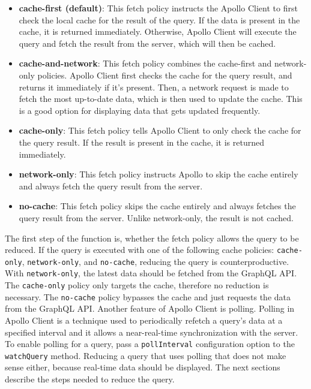 \begin{itemize}
  \item \textbf{cache-first (default)}: This fetch policy instructs the Apollo Client to first check the local cache for the result of the query. If the data is present in the cache, it is returned immediately. Otherwise, Apollo Client will execute the query and fetch the result from the server, which will then be cached.
  \item \textbf{cache-and-network}: This fetch policy combines the cache-first and network-only policies. Apollo Client first checks the cache for the query result, and returns it immediately if it's present. Then, a network request is made to fetch the most up-to-date data, which is then used to update the cache. This is a good option for displaying data that gets updated frequently.
  \item \textbf{cache-only}: This fetch policy tells Apollo Client to only check the cache for the query result. If the result is present in the cache, it is returned immediately.
  \item \textbf{network-only}: This fetch policy instructs Apollo to skip the cache entirely and always fetch the query result from the server.
  \item \textbf{no-cache}: This fetch policy skips the cache entirely and always fetches the query result from the server. Unlike network-only, the result is not cached.
\end{itemize}

\noindent The first step of the function is, whether the fetch policy allows the query to be reduced. If the query is executed with one of the following cache policies: \texttt{cache-only}, \texttt{network-only}, and \texttt{no-cache}, reducing the query is counterproductive. With \texttt{network-only}, the latest data should be fetched from the GraphQL \ac{API}. The \texttt{cache-only} policy only targets the cache, therefore no reduction is necessary. The \texttt{no-cache} policy bypasses the cache and just requests the data from the GraphQL \ac{API}. Another feature of Apollo Client is polling. Polling in Apollo Client is a technique used to periodically refetch a query's data at a specified interval and it allows a near-real-time synchronization with the server. To enable polling for a query, pass a \texttt{pollInterval} configuration option to the \texttt{watchQuery} method. Reducing a query that uses polling that does not make sense either, because real-time data should be displayed. The next sections describe the steps needed to reduce the query. 

